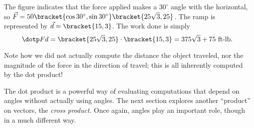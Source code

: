 {The figure indicates that the force applied makes a $30^\circ$ angle with the horizontal, so $\vec F = 50\bracket{\cos 30^\circ,\sin 30^\circ}\bracket{25\sqrt3,25}%
$. The ramp is represented by $\vec d  =\bracket{15,3}$. The work done is simply
\[\dotp Fd = \bracket{25\sqrt3,25}\cdot\bracket{15,3}=375\sqrt3+75%
\text{ ft-lb}.\]

Note how we did not actually compute the distance the object traveled, nor the magnitude of the force in the direction of travel; this is all inherently computed by the dot product!}

The dot product is a powerful way of evaluating computations that depend on angles without actually using angles. The next section explores another ``product'' on vectors, the \emph{cross product.} Once again, angles play an important role, though in a much different way.

